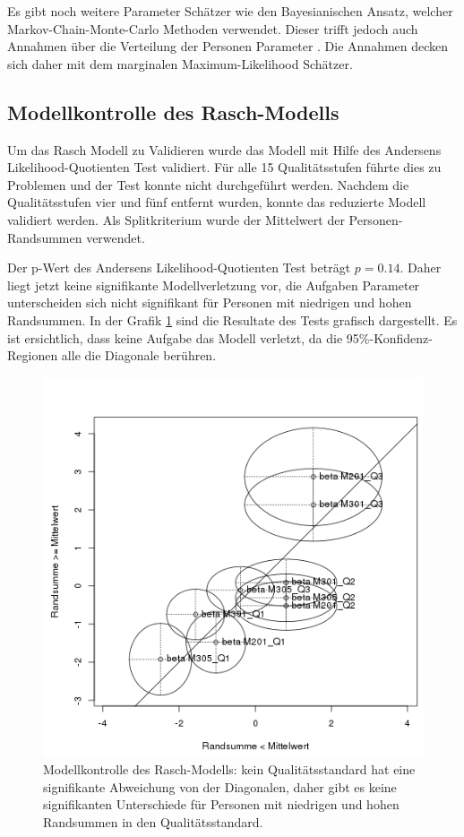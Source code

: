 Es gibt noch weitere Parameter Schätzer wie den Bayesianischen Ansatz, welcher Markov-Chain-Monte-Carlo Methoden verwendet. Dieser trifft jedoch auch Annahmen über die Verteilung der Personen Parameter \citep[siehe Kapitel 3]{Fischer1995}. Die Annahmen decken sich daher mit dem marginalen Maximum-Likelihood Schätzer. 




\subsection{Modellkontrolle des Rasch-Modells}

Um das Rasch Modell zu Validieren wurde das Modell mit Hilfe des Andersens Likelihood-Quotienten Test validiert. Für alle 15 Qualitätsstufen führte dies zu Problemen und der Test konnte nicht durchgeführt werden. Nachdem die Qualitätsstufen vier und fünf entfernt wurden, konnte das reduzierte Modell validiert werden. Als Splitkriterium wurde der Mittelwert der Personen-Randsummen verwendet. 

Der p-Wert des Andersens Likelihood-Quotienten Test beträgt $p=0.14$. Daher liegt jetzt keine signifikante Modellverletzung vor, die Aufgaben Parameter unterscheiden sich nicht signifikant für Personen mit niedrigen und hohen Randsummen. In der Grafik \ref{fig:RaschKontrolle} sind die Resultate des Tests grafisch dargestellt. Es ist ersichtlich, dass keine Aufgabe das Modell verletzt, da die 95\%-Konfidenz-Regionen alle die Diagonale berühren.


\begin{figure}[htbp]

\centering
\includegraphics[width=0.8\linewidth]{graphics/GOFQ.png}
\caption{Modellkontrolle des Rasch-Modells: kein Qualitätsstandard hat eine signifikante Abweichung von der Diagonalen, daher gibt es keine signifikanten Unterschiede für Personen mit niedrigen und hohen Randsummen in den Qualitätsstandard. }
\label{fig:RaschKontrolle}
\end{figure}

